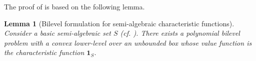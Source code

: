 \documentclass{article}
\newcommand{\mbf}[1]{\mathbf{#1}}
\newcommand*{\cY}{\mathcal{Y}}
\theoremstyle{plain}
\newtheorem{theorem}{Theorem}[section]
\newtheorem{lemma}[theorem]{Lemma}
\theoremstyle{definition}
\begin{document}

The proof of  is based on the following lemma.
\begin{lemma}[Bilevel formulation for semi-algebraic characteristic functions]
    \label{lem:constrained-convex-construction}
    Consider a basic semi-algebraic set $S$ (cf. ). There exists a polynomial bilevel problem with a convex lower-level over an unbounded box whose value function is the characteristic function $\mbf{1}_S$.
\end{lemma}
\end{document}
